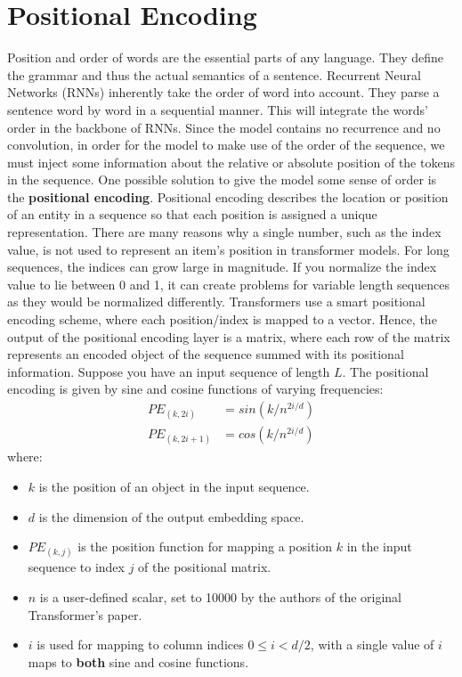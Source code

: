 \section{Positional Encoding}
Position and order of words are the essential parts of any language. They define the grammar and thus the actual semantics of a sentence. Recurrent Neural Networks (RNNs) inherently take the order of word into account. They parse a sentence word by word in a sequential manner. This will integrate the words’ order in the backbone of RNNs.
\newline\newline
Since the model contains no recurrence and no convolution, in order for the model to make use of the order of the sequence, we must inject some information about the relative or absolute position of the tokens in the sequence.\newline\newline
One possible solution to give the model some sense of order is the \textbf{positional encoding}.\newline\newline
Positional encoding describes the location or position of an entity in a sequence so that each position is assigned a unique representation. There are many reasons why a single number, such as the index value, is not used to represent an item’s position in transformer models. For long sequences, the indices can grow large in magnitude. If you normalize the index value to lie between 0 and 1, it can create problems for variable length sequences as they would be normalized differently.\newline\newline
Transformers use a smart positional encoding scheme, where each position/index is mapped to a vector. Hence, the output of the positional encoding layer is a matrix, where each row of the matrix represents an encoded object of the sequence summed with its positional information.\newline\newline
Suppose you have an input sequence of length $L$. The positional encoding is given by sine and cosine functions of varying frequencies:
\[
\begin{split}
    PE_{(k, 2i)} & = sin(k/n^{2i/d})\\
    PE_{(k, 2i + 1)} & = cos(k/n^{2i/d})
\end{split}
\]
where:
\begin{itemize}
    \item $k$ is the position of an object in the input sequence.
    \item $d$ is the dimension of the output embedding space.
    \item $PE_{(k,j)}$ is the position function for mapping a position $k$ in the input sequence to index $j$ of the positional matrix.
    \item $n$ is a user-defined scalar, set to 10000 by the authors of the original Transformer's paper.
    \item $i$ is used for mapping to column indices $ 0 \leq i < d/2$, with a single value of $i$ maps to \textbf{both} sine and cosine functions.
\end{itemize}
